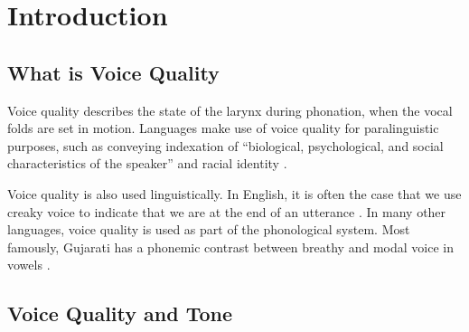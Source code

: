 
\chapter{Introduction} \label{chap:introduction}


\section{What is Voice Quality} \label{sec:voice_quality}
Voice quality describes the state of the larynx during phonation, when the vocal folds are set in motion. Languages make use of voice quality for paralinguistic purposes, such as conveying indexation of ``biological, psychological, and social characteristics of the speaker'' \citep{laverVoiceQualityIndexical1968} and racial identity \citep{podesvaStanceWindowLanguageRace2016}. 

Voice quality is also used linguistically. In English, it is often the case that we use creaky voice to indicate that we are at the end of an utterance \citep[e.g.,][]{garellekProductionPerceptionGlottal2013}. In many other languages, voice quality is used as part of the phonological system. Most famously, Gujarati has a phonemic contrast between breathy and modal voice in vowels \citep[e.g.,][]{fischer-jorgensenPhoneticAnalysisBreathy1968,espositoContrastiveBreathinessConsonants2012, khanPhoneticsContrastivePhonation2012,espositoDistinguishingBreathyConsonants2019}. 

\citet{espositoCrossLinguisticPatterns2020}

\section{Voice Quality and Tone} \label{sec:voice_quality_and_tone}

